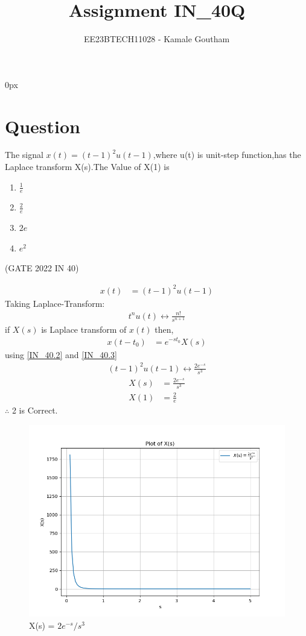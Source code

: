\documentclass[journal,12pt,twocolumn]{IEEEtran}
\theoremstyle{remark}
\begin{document}
\parindent 0px

\title{Assignment IN\_40Q}
\author{EE23BTECH11028 - Kamale Goutham$^{}$%
}
\maketitle
\newpage
\bigskip
\section*{Question}
The signal $x(t)=(t-1)^2u(t-1)$,where u(t) is unit-step function,has the Laplace transform X(s).The Value of X(1) is 
\begin{enumerate}
    \item $\frac{1}{e}$
    \item $\frac{2}{e}$
    \item $2e$
    \item $e^2$
\end{enumerate}
\hfill{(GATE 2022 IN 40)}\\
\solution

\begin{align}
    x(t)&=(t-1)^2u(t-1) 
\end{align}
  Taking Laplace-Transform:\\
\begin{align}
    t^nu(t) \leftrightarrow \frac{n!}{s^{n+1}} \label{IN_40.2}
\end{align}
if $X(s)$ is Laplace transform of $x(t)$ then,\\
\begin{align}
  x(t-t_0)&=e^{-st_0}X(s)\label{IN_40.3}
\end{align}
using \ref{IN_40.2} and \ref{IN_40.3}\\
\begin{align}
    (t-1)^2u(t-1) \leftrightarrow \frac{2e^{-s}}{s^3}
\end{align}
\begin{align}
    X(s)&=\frac{2e^{-s}}{s^3}\\
    X(1)&=\frac{2}{e}
\end{align}
$\therefore$ 2 is Correct.
\begin{figure}[h]
  \centering
  \includegraphics[width=\columnwidth]{figs/fig1.png}
  \caption{X(s) = $2e^{-s}/s^3$}
  \label{fig:graph}
\end{figure}
\end{document}
